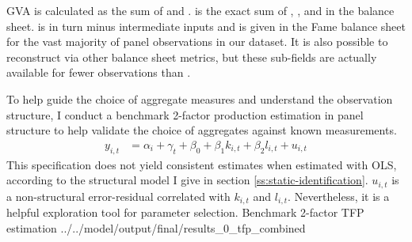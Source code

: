 GVA is calculated as the sum of  and .
 is the exact sum of , ,
and  in the balance sheet.
 is in turn  minus intermediate inputs and is
given in the Fame balance sheet for the vast majority of panel observations
in our dataset. It is also possible to reconstruct 
via other balance sheet metrics,
but these sub-fields are actually available for fewer observations than .

\pagebreak
To help guide the choice of aggregate measures and understand the observation structure,
I conduct a benchmark 2-factor production estimation in panel structure
to help validate the choice of aggregates against known measurements.
\begin{align}
    \label{eqn:tfp2factor}
    y_{i,t} &= \alpha_i + \gamma_t + \beta_0
                + \beta_1 k_{i,t}
                + \beta_2 l_{i,t}
                + u_{i,t}
\end{align}
This specification does not yield consistent estimates when estimated with OLS,
according to the structural model I give in section \ref{ss:static-identification}.
$u_{i,t}$ is a non-structural error-residual correlated with $k_{i,t}$ and $l_{i,t}$.
Nevertheless, it is a helpful exploration tool for parameter selection.
\wraptable
    {Benchmark 2-factor TFP estimation}
    {../../model/output/final/results_0_tfp_combined}
    {}


